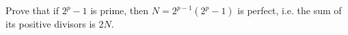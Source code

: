 Prove that if $2^p-1$ is prime, then $N=2^{p-1}\left(2^p-1\right)$ is perfect, i.e. the sum of its positive divisors is $2N$.
